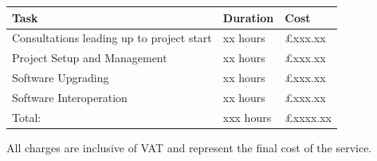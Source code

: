 \documentclass{letter}
\begin{document}
  \begin{tabular}{ p{} p{} p{} }
    Task & Duration & Cost   \\
    \hline \hline
    Consultations leading up to project start & xx hours & £xxx.xx   \\
    Project Setup  and Management & xx hours & £xxx.xx   \\
    Software Upgrading & xx hours & £xxx.xx \\
    Software Interoperation & xx hours & £xxx.xx \\
    \hline
    Total: & xxx hours & £xxxx.xx
  \end{tabular}

  \vspace{20pt}
  
  All charges are inclusive of VAT and represent the final cost of the service. \\\\

\end{document}
